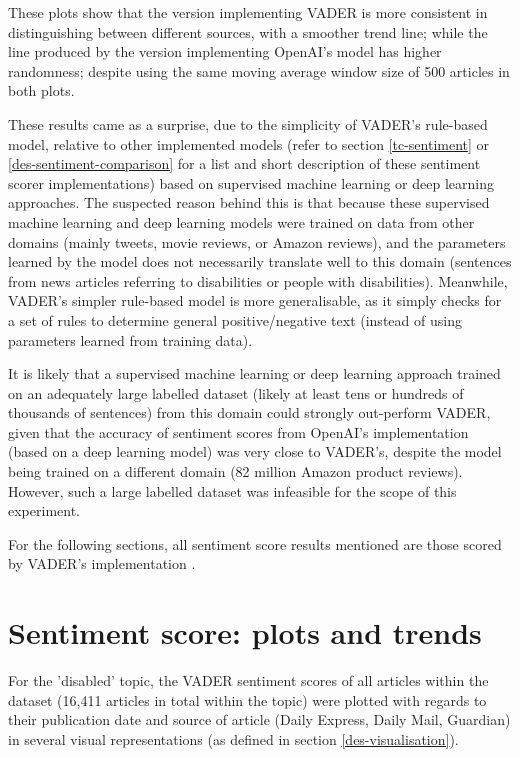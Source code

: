 \documentclass{report}
\begin{document}
These plots show that the version implementing VADER is more consistent in distinguishing between different sources, with a smoother trend line; while the line produced by the version implementing OpenAI's model has higher randomness; despite using the same moving average window size of 500 articles in both plots.

These results came as a surprise, due to the simplicity of VADER's rule-based model, relative to other implemented models (refer to section \ref{tc-sentiment} or \ref{des-sentiment-comparison} for a list and short description of these sentiment scorer implementations) based on supervised machine learning or deep learning approaches.
The suspected reason behind this is that because these supervised machine learning and deep learning models were trained on data from other domains (mainly tweets, movie reviews, or Amazon reviews), and the parameters learned by the model does not necessarily translate well to this domain (sentences from news articles referring to disabilities or people with disabilities). 
Meanwhile, VADER's simpler rule-based model is more generalisable, as it simply checks for a set of rules to determine general positive/negative text (instead of using parameters learned from training data).

It is likely that a supervised machine learning or deep learning approach trained on an adequately large labelled dataset (likely at least tens or hundreds of thousands of sentences) from this domain could strongly out-perform VADER, given that the accuracy of sentiment scores from OpenAI's implementation (based on a deep learning model) was very close to VADER's, despite the model being trained on a different domain (82 million Amazon product reviews). 
However, such a large labelled dataset was infeasible for the scope of this experiment.

For the following sections, all sentiment score results mentioned are those scored by VADER's implementation \cite{VADER}.

\section{Sentiment score: plots and trends} \label{Sentiment score: plots and trends}
For the 'disabled' topic, the VADER sentiment scores of all articles within the dataset (16,411 articles in total within the topic) were plotted with regards to their publication date and source of article (Daily Express, Daily Mail, Guardian) in several visual representations (as defined in section \ref{des-visualisation}).
\end{document}

